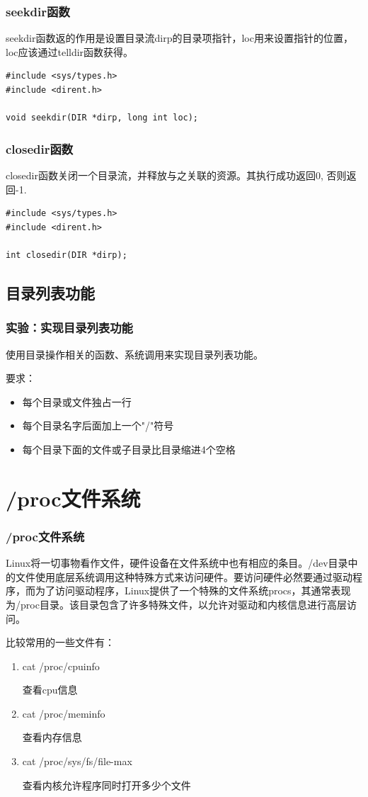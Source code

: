 \documentclass{beamer}
\begin{document}
\begin{frame}[fragile]
\frametitle{seekdir函数}
seekdir函数返的作用是设置目录流dirp的目录项指针，loc用来设置指针的位置，loc应该通过telldir函数获得。
\begin{example}[seekdir函数原型]
\begin{verbatim}
#include <sys/types.h>
#include <dirent.h>

void seekdir(DIR *dirp, long int loc);
\end{verbatim}
\end{example}
\end{frame}

\begin{frame}[fragile]
\frametitle{closedir函数}
closedir函数关闭一个目录流，并释放与之关联的资源。其执行成功返回0, 否则返回-1.
\begin{example}[closedir函数原型]
\begin{verbatim}
#include <sys/types.h>
#include <dirent.h>

int closedir(DIR *dirp);
\end{verbatim}
\end{example}
\end{frame}
\subsection{目录列表功能}
\begin{frame}
\frametitle{实验：实现目录列表功能}
使用目录操作相关的函数、系统调用来实现目录列表功能。

要求：
\begin{itemize}
\item
每个目录或文件独占一行
\item
每个目录名字后面加上一个"/"符号
\item
每个目录下面的文件或子目录比目录缩进4个空格
\end{itemize}
\end{frame}
\section{/proc文件系统}
\begin{frame}
\frametitle{/proc文件系统}
Linux将一切事物看作文件，硬件设备在文件系统中也有相应的条目。/dev目录中的文件使用底层系统调用这种特殊方式来访问硬件。要访问硬件必然要通过驱动程序，而为了访问驱动程序，Linux提供了一个特殊的文件系统procs，其通常表现为/proc目录。该目录包含了许多特殊文件，以允许对驱动和内核信息进行高层访问。

比较常用的一些文件有：
\begin{enumerate}
\item
cat /proc/cpuinfo

查看cpu信息
\item
cat /proc/meminfo

查看内存信息
\item
cat /proc/sys/fs/file-max

查看内核允许程序同时打开多少个文件
\end{enumerate}
\end{frame}
\end{document}
